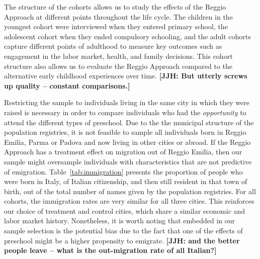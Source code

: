 \begin{table}[H]
\centering
{}
\end{table}

The structure of the cohorts allows us to study the effects of the Reggio Approach at different points throughout the life cycle. The children in the youngest cohort were interviewed when they entered primary school, the adolescent cohort when they ended compulsory schooling, and the adult cohorts capture different points of adulthood to measure key outcomes such as engagement in the labor market, health, and family decisions. This cohort structure also allows us to evaluate the Reggio Approach compared to the alternative early childhood experiences over time. \textbf{[JJH: But utterly screws up quality -- constant comparisons.]}

Restricting the sample to individuals living in the same city in which they were raised is necessary in order to compare individuals who had the \textit{opportunity} to attend the different types of preschool. Due to the the municipal structure of the population registries, it is not feasible to sample all individuals born in Reggio Emilia, Parma or Padova and now living in other cities or abroad. If the Reggio Approach has a treatment effect on migration out of Reggio Emilia, then our sample might oversample individuals with characteristics that are not predictive of emigration. Table~\ref{tab:immigration} presents the proportion of people who were born in Italy, of Italian citizenship, and then still resident in that town of birth, out of the total number of names given by the population registries. For all cohorts, the immigration rates are very similar for all three cities. This reinforces our choice of treatment and control cities, which share a similar economic and labor market history. Nonetheless, it is worth noting that embedded in our sample selection is the potential bias due to the fact that one of the effects of preschool might be a higher propensity to emigrate. \textbf{[JJH: and the better people leave -- what is the out-migration rate of all Italian?]}

